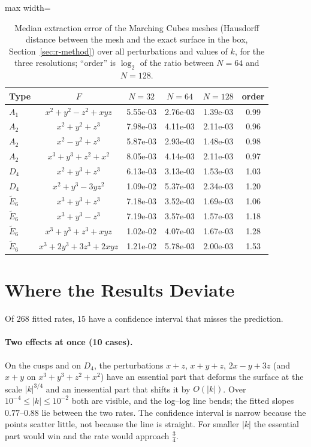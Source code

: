 \documentclass[12pt, a4paper]{article}
\theoremstyle{plain}
\theoremstyle{definition}
\theoremstyle{remark}
\theoremstyle{definition}
\begin{document}
\begin{table}[!h]
\centering
\small
\begin{adjustbox}{max width=\textwidth}
\begin{tabular}{l c c c c c}
\toprule
Type & $F$ & $N=32$ & $N=64$ & $N=128$ & order \\
\midrule
$A_1$ & $x^2+y^2-z^2+xyz$ & 5.55e-03 & 2.76e-03 & 1.39e-03 & 0.99 \\
$A_2$ & $x^2+y^2+z^3$ & 7.98e-03 & 4.11e-03 & 2.11e-03 & 0.96 \\
$A_2$ & $x^2-y^2+z^3$ & 5.87e-03 & 2.93e-03 & 1.48e-03 & 0.98 \\
$A_2$ & $x^3+y^3+z^2+x^2$ & 8.05e-03 & 4.14e-03 & 2.11e-03 & 0.97 \\
$D_4$ & $x^2+y^3+z^3$ & 6.13e-03 & 3.13e-03 & 1.53e-03 & 1.03 \\
$D_4$ & $x^2+y^3-3yz^2$ & 1.09e-02 & 5.37e-03 & 2.34e-03 & 1.20 \\
$\tilde E_6$ & $x^3+y^3+z^3$ & 7.18e-03 & 3.52e-03 & 1.69e-03 & 1.06 \\
$\tilde E_6$ & $x^3+y^3-z^3$ & 7.19e-03 & 3.57e-03 & 1.57e-03 & 1.18 \\
$\tilde E_6$ & $x^3+y^3+z^3+xyz$ & 1.02e-02 & 4.07e-03 & 1.67e-03 & 1.28 \\
$\tilde E_6$ & $x^3+2y^3+3z^3+2xyz$ & 1.21e-02 & 5.78e-03 & 2.00e-03 & 1.53 \\
\bottomrule
\end{tabular}
\end{adjustbox}
\caption[Extraction error]{Median extraction error of the Marching Cubes meshes (Hausdorff distance between the mesh and the exact surface in the box, Section~\ref{sec:r-method}) over all perturbations and values of $k$, for the three resolutions; ``order'' is $\log_2$ of the ratio between $N=64$ and $N=128$.}
\label{tab:extraction-error}
\end{table}

\section{Where the Results Deviate}
\label{sec:r-deviations}

Of $268$ fitted rates, $15$ have a confidence interval that misses the prediction.

\paragraph{Two effects at once (10 cases).} On the cusps and on $D_4$, the
perturbations $x+z$, $x+y+z$, $2x-y+3z$ (and $x+y$ on $x^3+y^3+z^2+x^2$) have an
essential part that deforms the surface at the scale $|k|^{3/4}$ and an
inessential part that shifts it by $O(|k|)$. Over $10^{-4}\le|k|\le10^{-2}$ both
are visible, and the log--log line bends; the fitted slopes $0.77$--$0.88$ lie
between the two rates. The confidence interval is narrow because the points
scatter little, not because the line is straight. For smaller $|k|$ the essential
part would win and the rate would approach $\tfrac34$.
\end{document}
